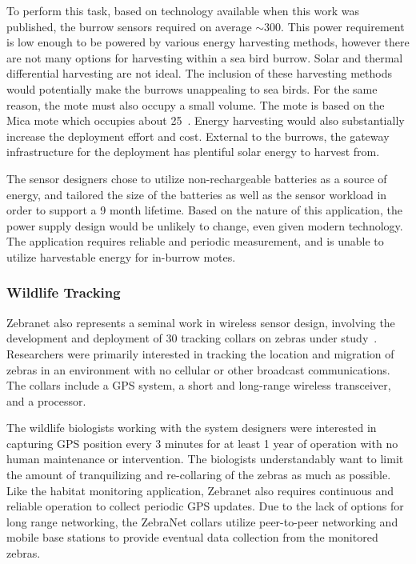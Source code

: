 To perform this task, based on technology available when this work was published, the burrow sensors required on average $\sim$300\ssi{\micro\watt}. This power requirement is low enough to be powered by various energy harvesting methods, however there are not many options for harvesting within a sea bird burrow. Solar and thermal differential harvesting are not ideal. The inclusion of these harvesting methods would potentially make the burrows unappealing to sea birds. For the same reason, the mote must also occupy a small volume. The mote is based on the Mica mote which occupies about 25\ssi{\centi\meter\cubed}~\cite{hill2002wireless}.
Energy harvesting would also substantially increase the deployment effort and cost.
External to the burrows, the gateway infrastructure for the deployment has plentiful solar energy to harvest from.

The sensor designers chose to utilize non-rechargeable batteries as a source of energy, and tailored the size of the batteries as well as the sensor workload in order to support a 9 month lifetime.
Based on the nature of this application, the power supply design would be unlikely to change, even given modern technology.
The application requires reliable and periodic measurement, and is unable to utilize harvestable energy for in-burrow motes.

\subsubsection{Wildlife Tracking}
Zebranet also represents a seminal work in wireless sensor design, involving the development and deployment of 30 tracking collars on zebras under study~\cite{juang2002energy}. Researchers were primarily interested in tracking the location and migration of zebras in an environment with no cellular or other broadcast communications. The collars include a GPS system, a short and long-range wireless transceiver, and a processor.

The wildlife biologists working with the system designers were interested in capturing GPS position every 3 minutes for at least 1 year of operation with no human maintenance or intervention. The biologists understandably want to limit the amount of tranquilizing and re-collaring of the zebras as much as possible. Like the habitat monitoring application, Zebranet also requires continuous and reliable operation to collect periodic GPS updates. Due to the lack of options for long range networking, the ZebraNet collars utilize peer-to-peer networking and mobile base stations to provide eventual data collection from the monitored zebras.

